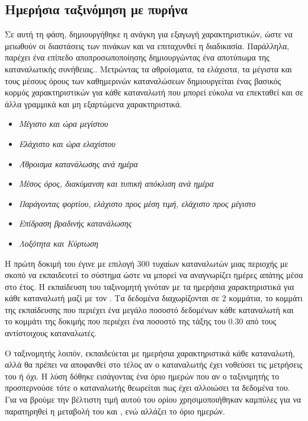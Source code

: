\subsection{Ημερήσια ταξινόμηση με πυρήνα }
\label{sec:RBFkernel}
Σε αυτή τη φάση, δημιουργήθηκε η ανάγκη για εξαγωγή χαρακτηριστικών, ώστε να μειωθούν οι διαστάσεις των πινάκων και να επιταχυνθεί η διαδικασία. Παράλληλα, παρέχει ένα επίπεδο αποπροσωποποίησης δημιουργώντας ένα αποτύπωμα της καταναλωτικής συνήθειας.\cite{giwrgis}. Μετρώντας τα αθροίσματα, τα ελάχιστα, τα μέγιστα και τους μέσους όρους των καθημερινών καταναλώσεων δημιουργείται ένας βασικός κορμός χαρακτηριστικών για κάθε καταναλωτή που μπορεί εύκολα να επεκταθεί και σε άλλα γραμμικά και μη εξαρτώμενα χαρακτηριστικά.
\begin{itemize}
\item \textit{Μέγιστο και ώρα μεγίστου}
\item \textit{Ελάχιστο και ώρα ελαχίστου}
\item \textit{Άθροισμα κατανάλωσης ανά ημέρα}
\item \textit{Μέσος όρος, διακύμανση και τυπική απόκλιση ανά ημέρα}
\item \textit{Παράγοντας φορτίου, ελάχιστο προς μέση τιμή, ελάχιστο προς μέγιστο}
\item \textit{Επίδραση βραδινής κατανάλωσης}
\item \textit{Λοξότητα και Κύρτωση}
\end{itemize}
Η πρώτη δοκιμή του  έγινε με επιλογή 300 τυχαίων καταναλωτών μιας περιοχής με σκοπό να εκπαιδευτεί το σύστημα ώστε να μπορεί να αναγνωρίζει ημέρες απάτης μέσα στο έτος. Η εκπαίδευση του ταξινομητή γινόταν με τα ημερήσια χαρακτηριστικά για κάθε καταναλωτή μαζί με τον . Τα δεδομένα διαχωρίζονται σε 2 κομμάτια, το κομμάτι της εκπαίδευσης που περιέχει ένα μεγάλο ποσοστό δεδομένων κάθε καταναλωτή και το κομμάτι της δοκιμής που περιέχει ένα ποσοστό της τάξης του $0.30$ από τους αντίστοιχους καταναλωτές.\par
Ο ταξινομητής λοιπόν, εκπαιδεύεται με ημερήσια χαρακτηριστικά κάθε καταναλωτή, αλλά θα πρέπει να αποφανθεί στο τέλος αν ο καταναλωτής έχει νοθεύσει τις μετρήσεις του ή όχι. Η λύση δόθηκε εισάγοντας ένα όριο ημερών που αν ο ταξινιμητής το προσπερνούσε τότε ο καταναλωτής θεωρείται πως έχει αλλοιώσει τα δεδομένα του. Για να βρούμε την βέλτιστη τιμή αυτού του ορίου χρησιμοποιήθηκαν  καμπύλες για να παρατηρηθεί η μεταβολή του  και , ενώ αλλάζει το όριο ημερών.\\
